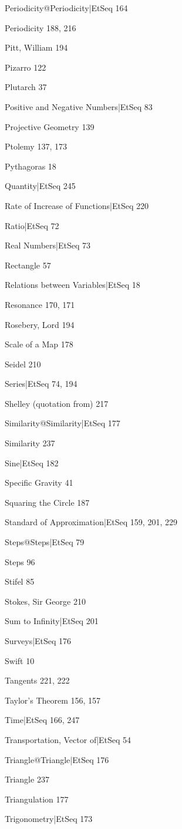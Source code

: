 \documentclass[12pt,leqno]{book}[2005/09/16]
\begin{document}
Periodicity@Periodicity|EtSeq 164

Periodicity 188, 216

Pitt, William 194

Pizarro 122

Plutarch 37

Positive and Negative Numbers|EtSeq 83

Projective Geometry 139

Ptolemy 137, 173

Pythagoras 18

Quantity|EtSeq 245

Rate of Increase of Functions|EtSeq 220

Ratio|EtSeq 72

Real Numbers|EtSeq 73

Rectangle 57

Relations between Variables|EtSeq 18

Resonance 170, 171

Rosebery, Lord 194

Scale of a Map 178

Seidel 210

Series|EtSeq 74, 194

Shelley (quotation from) 217

Similarity@Similarity|EtSeq 177

Similarity 237

Sine|EtSeq 182

Specific Gravity 41

Squaring the Circle 187

Standard of Approximation|EtSeq 159, 201, 229

Steps@Steps|EtSeq 79

Steps 96

Stifel 85

Stokes, Sir George 210

Sum to Infinity|EtSeq 201

Surveys|EtSeq 176

Swift 10

Tangents 221, 222

Taylor's Theorem 156, 157

Time|EtSeq 166, 247

Transportation, Vector of|EtSeq 54

Triangle@Triangle|EtSeq 176

Triangle 237

Triangulation 177

Trigonometry|EtSeq 173
\end{document}
